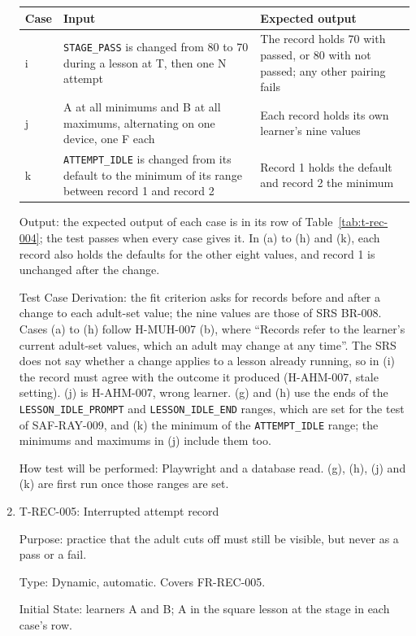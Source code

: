 \documentclass[12pt, titlepage]{article}
\newcommand{\testitem}[1]{\item #1\par\nopagebreak}
\begin{document}
\begin{enumerate}
\begin{table}[htbp]
\medskip
\begin{tabularx}{\textwidth}{@{}l >{\raggedright\arraybackslash}X
  >{\raggedright\arraybackslash}X@{}}
\toprule
\textbf{Case} & \textbf{Input} & \textbf{Expected output}\\
\midrule
i & \texttt{STAGE\_PASS} is changed from 80 to 70 during a lesson at T,
then one N attempt & The record holds 70 with passed, or 80 with not
passed; any other pairing fails\\
j & A at all minimums and B at all maximums, alternating on one device,
one F each & Each record holds its own learner's nine values\\
k & \texttt{ATTEMPT\_IDLE} is changed from its default to the minimum of
its range between record 1 and record 2 & Record 1 holds the default and
record 2 the minimum\\
\bottomrule
\end{tabularx}
\end{table}

Output: the expected output of each case is in its row of
Table~\ref{tab:t-rec-004}; the test passes when every case gives it. In
(a) to (h) and (k), each record also holds the defaults for the other eight
values, and record 1 is unchanged after the change.

Test Case Derivation: the fit criterion asks for records before and after a
change to each adult-set value; the nine values are those of SRS BR-008.
Cases (a) to (h) follow H-MUH-007 (b), where ``Records refer to the
learner's current adult-set values, which an adult may change at any
time''. The SRS does not say whether a change applies to a lesson already
running, so in (i) the record must agree with the outcome it produced
(H-AHM-007, stale setting). (j) is H-AHM-007, wrong learner. (g) and (h) use
the ends of the \texttt{LESSON\_IDLE\_PROMPT} and
\texttt{LESSON\_IDLE\_END} ranges,
which are set for the test of SAF-RAY-009, and (k) the minimum of the
\texttt{ATTEMPT\_IDLE} range; the minimums and maximums in (j) include them
too.

How test will be performed: Playwright and a database read. (g), (h), (j)
and (k) are first run once those ranges are set.

\testitem{T-REC-005: Interrupted attempt record}

Purpose: practice that the adult cuts off must still be visible, but never
as a pass or a fail.

Type: Dynamic, automatic. Covers FR-REC-005.

Initial State: learners A and B; A in the square lesson at the stage in
each case's row.


\end{enumerate}
\end{document}
